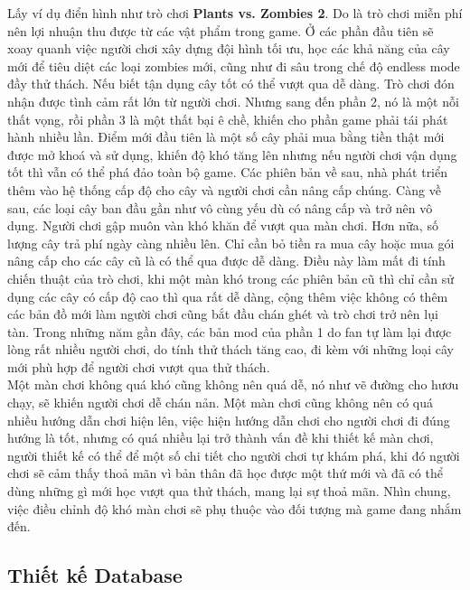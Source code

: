 \begin{itemize}
	Lấy ví dụ điển hình như trò chơi \textbf{Plants vs. Zombies 2}. Do là trò chơi miễn phí nên lợi nhuận thu được từ các vật phẩm trong game. Ở các phần đầu tiên sẽ xoay quanh việc người chơi xây dựng đội hình tối ưu, học các khả năng của cây mới để tiêu diệt các loại zombies mới, cũng như đi sâu trong chế độ endless mode đầy thử thách. Nếu biết tận dụng cây tốt có thể vượt qua dễ dàng. Trò chơi đón nhận được tình cảm rất lớn từ người chơi. Nhưng sang đến phần 2, nó là một nỗi thất vọng, rồi phần 3 là một thất bại ê chề, khiến cho phần game phải tái phát hành nhiều lần. Điểm mới đầu tiên là một số cây phải mua bằng tiền thật mới được mở khoá và sử dụng, khiến độ khó tăng lên nhưng nếu người chơi vận dụng tốt thì vẫn có thể phá đảo toàn bộ game. Các phiên bản về sau, nhà phát triển thêm vào hệ thống cấp độ cho cây và người chơi cần nâng cấp chúng. Càng về sau, các loại cây ban đầu gần như vô cùng yếu dù có nâng cấp và trở nên vô dụng. Người chơi gập muôn vàn khó khăn để vượt qua màn chơi. Hơn nữa, số lượng cây trả phí ngày càng nhiều lên. Chỉ cần bỏ tiền ra mua cây hoặc mua gói nâng cấp cho các cây cũ là có thể qua được dễ dàng. Điều này làm mất đi tính chiến thuật của trò chơi, khi một màn khó trong các phiên bản cũ thì chỉ cần sử dụng các cây có cấp độ cao thì qua rất dễ dàng, cộng thêm việc không có thêm các bản đồ mới làm người chơi cũng bắt đầu chán ghét và trò chơi trở nên lụi tàn. Trong những năm gần đây, các bản mod của phần 1 do fan tự làm lại được lòng rất nhiều người chơi, do tính thử thách tăng cao, đi kèm với những loại cây mới phù hợp để người chơi vượt qua thử thách.\\
	Một màn chơi không quá khó cũng không nên quá dễ, nó như vẽ đường cho hươu chạy, sẽ khiến người chơi dễ chán nản. Một màn chơi cũng không nên có quá nhiều hướng dẫn chơi hiện lên, việc hiện hướng dẫn chơi cho người chơi đi đúng hướng là tốt, nhưng có quá nhiều lại trở thành vấn đề khi thiết kế màn chơi, người thiết kế có thể để một số chi tiết cho người chơi tự khám phá, khi đó người chơi sẽ cảm thấy thoả mãn vì bản thân đã học được một thứ mới và đã có thể dùng những gì mới học vượt qua thử thách, mang lại sự thoả mãn. Nhìn chung, việc điều chỉnh độ khó màn chơi sẽ phụ thuộc vào đối tượng mà game đang nhắm đến.\\ 
\end{itemize}


\subsection{Thiết kế Database}
